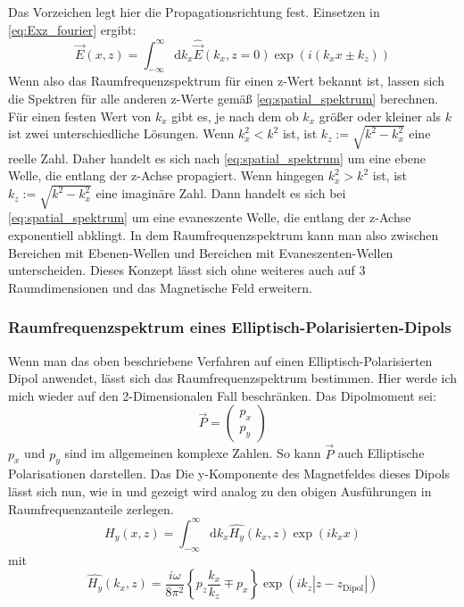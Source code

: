\documentclass{article}
\begin{document}
	Das Vorzeichen legt hier die Propagationsrichtung fest.
	Einsetzen in \eqref{eq:Exz_fourier} ergibt:
		\begin{equation}
			\label{eq:Espatial_spektrum}
			\vec{E}(x,z) = \int_{-\infty}^{\infty}\mathrm{d}{k_x}\hat{\vec{E}}(k_x,z= 0)\exp(i(k_xx\pm k_ z))
		\end{equation}
	Wenn also das Raumfrequenzspektrum für einen z-Wert bekannt ist, lassen sich die Spektren für alle anderen z-Werte gemäß \eqref{eq:spatial_spektrum} berechnen. Für einen festen Wert von $k_x$ gibt es, je nach dem ob $k_x$ größer oder kleiner als $k$ ist zwei unterschiedliche Lösungen. Wenn $k_x^2 < k^2$ ist, ist $k_z := \sqrt{k^2-k_x^2}$ eine reelle Zahl. Daher handelt es sich nach \eqref{eq:spatial_spektrum} um eine ebene Welle, die entlang der z-Achse propagiert.
	Wenn hingegen $k_x^2 > k^2$ ist, ist $k_z := \sqrt{k^2-k_x^2}$ eine imaginäre Zahl. Dann handelt es sich bei \eqref{eq:spatial_spektrum} um eine evaneszente Welle, die entlang der z-Achse exponentiell abklingt. In dem Raumfrequenzspektrum kann man also zwischen Bereichen mit Ebenen-Wellen und  Bereichen mit Evaneszenten-Wellen unterscheiden. Dieses Konzept lässt sich ohne weiteres auch auf 3 Raumdimensionen und das Magnetische Feld erweitern.
	\subsubsection{Raumfrequenzspektrum eines Elliptisch-Polarisierten-Dipols}
		Wenn man das oben beschriebene Verfahren auf einen Elliptisch-Polarisierten Dipol anwendet, lässt sich das Raumfrequenzspektrum bestimmen. Hier werde ich mich wieder auf den 2-Dimensionalen Fall beschränken. Das Dipolmoment sei: $$\vec{P}= \begin{pmatrix} p_x \\ p_y \end{pmatrix}$$
		$p_x$ und $p_y$ sind im allgemeinen komplexe Zahlen. So kann $\vec{P}$ auch Elliptische Polarisationen darstellen. Das Die y-Komponente des Magnetfeldes dieses Dipols lässt sich nun, wie in \cite{Novotny.2012b} und \cite{RodriguezFortuno.2013} gezeigt wird analog zu den obigen Ausführungen in Raumfrequenzanteile zerlegen.
		\begin{equation}
			H_y(x, z) = \int_{-\infty}^{\infty}\mathrm{d}k_x\hat{H_y}(k_x, z)\exp(ik _xx)
		\end{equation}
		mit
		\begin{equation}
			\boxed{\hat{H_y}(k_x, z) = \dfrac{i\omega}{8\pi^2}\left\{p_z\dfrac{k_x}{k_z} \mp p_x\right\}\exp(ik_z|z-z_{\mathrm{Dipol}}|)}
		\end{equation}
\end{document}
